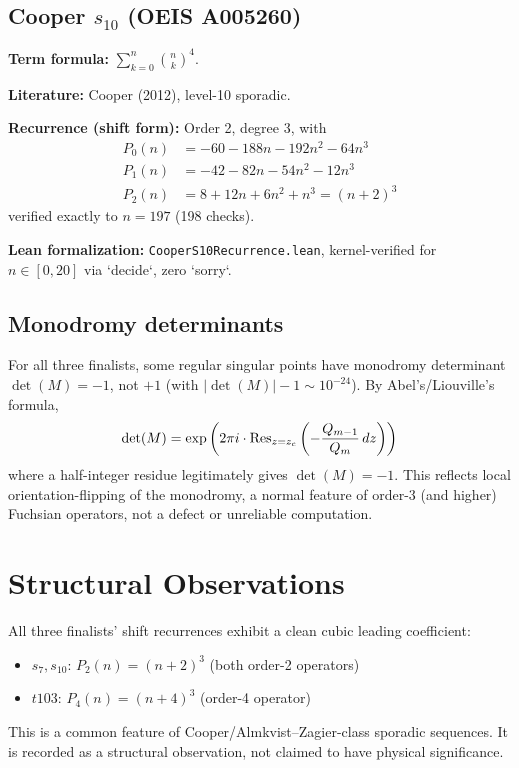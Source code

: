 \documentclass[aps,prd,twocolumn,nofootinbib,superscriptaddress,10pt]{revtex4-2}
\begin{document}
\subsection{Cooper $s_{10}$ (OEIS A005260)}

\textbf{Term formula:} $\sum_{k=0}^{n} \binom{n}{k}^4$.

\textbf{Literature:} Cooper (2012), level-10 sporadic.

\textbf{Recurrence (shift form):} Order 2, degree 3, with
\begin{align}
P_0(n) &= -60 - 188n - 192n^2 - 64n^3 \\
P_1(n) &= -42 - 82n - 54n^2 - 12n^3 \\
P_2(n) &= 8 + 12n + 6n^2 + n^3 = (n+2)^3
\end{align}
verified exactly to $n = 197$ (198 checks).

\textbf{Lean formalization:} \texttt{CooperS10Recurrence.lean}, kernel-verified for $n \in [0,20]$ via `decide`, zero `sorry`.

\subsection{Monodromy determinants}

For all three finalists, some regular singular points have monodromy determinant $\det(M) = -1$, not $+1$ (with $|\det(M)| - 1 \sim 10^{-24}$). By Abel's/Liouville's formula,
\[ \det(M) = \exp\left(2\pi i \cdot {\rm Res}_{z=z_c} \left( -\frac{Q_{m-1}}{Q_m} \, dz \right) \right) \]
where a half-integer residue legitimately gives $\det(M) = -1$. This reflects local orientation-flipping of the monodromy, a normal feature of order-3 (and higher) Fuchsian operators, not a defect or unreliable computation.

\section{Structural Observations}

All three finalists' shift recurrences exhibit a clean cubic leading coefficient:
\begin{itemize}
    \item $s_7, s_{10}$: $P_2(n) = (n+2)^3$ (both order-2 operators)
    \item $t103$: $P_4(n) = (n+4)^3$ (order-4 operator)
\end{itemize}
This is a common feature of Cooper/Almkvist--Zagier-class sporadic sequences. It is recorded as a structural observation, not claimed to have physical significance.
\end{document}
